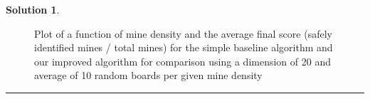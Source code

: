 \documentclass{article}
\theoremstyle{definition}
\def\fline{\rule{0.75\linewidth}{0.5pt}}
\newcommand{\finishline}{\vspace{-15pt}\begin{center}\fline\end{center}}
\newtheorem*{solution*}{Solution}
\newenvironment{solution}{\begin{solution*}}{{\finishline} \end{solution*}}
\begin{document}
\smallskip

\begin{solution}

    \begin{figure}[h]
	\centering
	\caption{Plot of a function of mine density and the average final score (safely identified mines / total mines) for the simple baseline algorithm and our improved algorithm for comparison using a dimension of 20 and average of 10 random boards per given mine density}
	\end{figure}
	

\end{solution}
\end{document}
